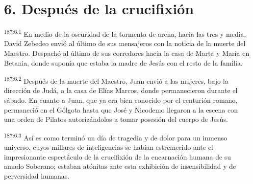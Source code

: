 \section*{6. Después de la crucifixión}
\par 
\textsuperscript{187:6.1} En medio de la oscuridad de la tormenta de arena, hacia las tres y media, David Zebedeo envió al último de sus mensajeros con la noticia de la muerte del Maestro. Despachó al último de sus corredores hacia la casa de Marta y María en Betania, donde suponía que estaba la madre de Jesús con el resto de la familia.

\par 
\textsuperscript{187:6.2} Después de la muerte del Maestro, Juan envió a las mujeres, bajo la dirección de Judá, a la casa de Elías Marcos, donde permanecieron durante el sábado. En cuanto a Juan, que ya era bien conocido por el centurión romano, permaneció en el Gólgota hasta que José y Nicodemo llegaron a la escena con una orden de Pilatos autorizándolos a tomar posesión del cuerpo de Jesús.

\par 
\textsuperscript{187:6.3} Así es como terminó un día de tragedia y de dolor para un inmenso universo, cuyos millares de inteligencias se habían estremecido ante el impresionante espectáculo de la crucifixión de la encarnación humana de su amado Soberano; estaban atónitas ante esta exhibición de insensibilidad y de perversidad humanas.